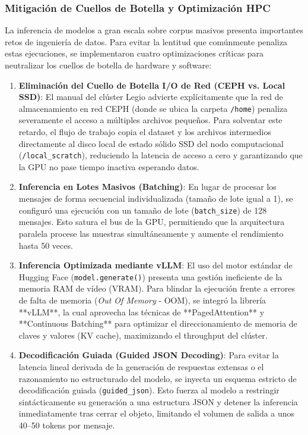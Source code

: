 \subsubsection{Mitigación de Cuellos de Botella y Optimización HPC}
La inferencia de modelos a gran escala sobre corpus masivos presenta importantes retos de ingeniería de datos. Para evitar la lentitud que comúnmente penaliza estas ejecuciones, se implementaron cuatro optimizaciones críticas para neutralizar los cuellos de botella de hardware y software:
\begin{enumerate}
    \item \textbf{Eliminación del Cuello de Botella I/O de Red (CEPH vs. Local SSD)}: El manual del clúster Legio advierte explícitamente que la red de almacenamiento en red CEPH (donde se ubica la carpeta \texttt{/home}) penaliza severamente el acceso a múltiples archivos pequeños. Para solventar este retardo, el flujo de trabajo copia el dataset y los archivos intermedios directamente al disco local de estado sólido SSD del nodo computacional (\texttt{/local\_scratch}), reduciendo la latencia de acceso a cero y garantizando que la GPU no pase tiempo inactiva esperando datos.
    \item \textbf{Inferencia en Lotes Masivos (Batching)}: En lugar de procesar los mensajes de forma secuencial individualizada (tamaño de lote igual a 1), se configuró una ejecución con un tamaño de lote (\texttt{batch\_size}) de 128 mensajes. Esto satura el bus de la GPU, permitiendo que la arquitectura paralela procese las muestras simultáneamente y aumente el rendimiento hasta 50 veces.
    \item \textbf{Inferencia Optimizada mediante vLLM}: El uso del motor estándar de Hugging Face (\texttt{model.generate()}) presenta una gestión ineficiente de la memoria RAM de vídeo (VRAM). Para blindar la ejecución frente a errores de falta de memoria (\textit{Out Of Memory} - OOM), se integró la librería **vLLM**, la cual aprovecha las técnicas de **PagedAttention** y **Continuous Batching** para optimizar el direccionamiento de memoria de claves y valores (KV cache), maximizando el throughput del clúster.
    \item \textbf{Decodificación Guiada (Guided JSON Decoding)}: Para evitar la latencia lineal derivada de la generación de respuestas extensas o el razonamiento no estructurado del modelo, se inyecta un esquema estricto de decodificación guiada (\texttt{guided\_json}). Esto fuerza al modelo a restringir sintácticamente su generación a una estructura JSON y detener la inferencia inmediatamente tras cerrar el objeto, limitando el volumen de salida a unos 40--50 tokens por mensaje.
\end{enumerate}

